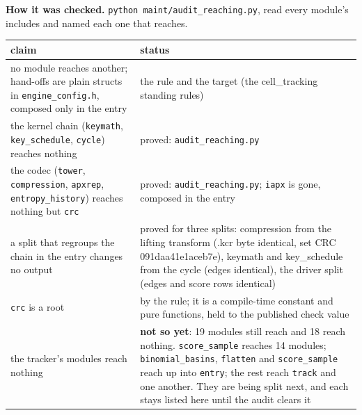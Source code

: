 \textbf{How it was checked.} \texttt{python maint/\allowbreak{}audit\_\allowbreak{}reaching.\allowbreak{}py}, read every module's includes and named each one that reaches.

{\small
\setlength{\tabcolsep}{6pt}
\begin{longtable}{>{\RaggedRight\arraybackslash}p{}>{\RaggedRight\arraybackslash}p{}}
\toprule
claim & status \\
\midrule
\endhead
no module reaches another; hand-offs are plain structs in \texttt{engine\_\allowbreak{}config.\allowbreak{}h}, composed only in the entry & the rule and the target (the cell\_\allowbreak{}tracking standing rules) \\
the kernel chain (\texttt{keymath}, \texttt{key\_\allowbreak{}schedule}, \texttt{cycle}) reaches nothing & proved: \texttt{audit\_\allowbreak{}reaching.\allowbreak{}py} \\
the codec (\texttt{tower}, \texttt{compression}, \texttt{apxrep}, \texttt{entropy\_\allowbreak{}history}) reaches nothing but \texttt{crc} & proved: \texttt{audit\_\allowbreak{}reaching.\allowbreak{}py}; \texttt{iapx} is gone, composed in the entry \\
a split that regroups the chain in the entry changes no output & proved for three splits: compression from the lifting transform (.kcr byte identical, set CRC 091daa41e1aceb7e), keymath and key\_\allowbreak{}schedule from the cycle (edges identical), the driver split (edges and score rows identical) \\
\texttt{crc} is a root & by the rule; it is a compile-time constant and pure functions, held to the published check value \\
the tracker's modules reach nothing & \textbf{not so yet}: 19 modules still reach and 18 reach nothing. \texttt{score\_\allowbreak{}sample} reaches 14 modules; \texttt{binomial\_\allowbreak{}basins}, \texttt{flatten} and \texttt{score\_\allowbreak{}sample} reach up into \texttt{entry}; the rest reach \texttt{track} and one another. They are being split next, and each stays listed here until the audit clears it \\
\bottomrule
\end{longtable}
}
